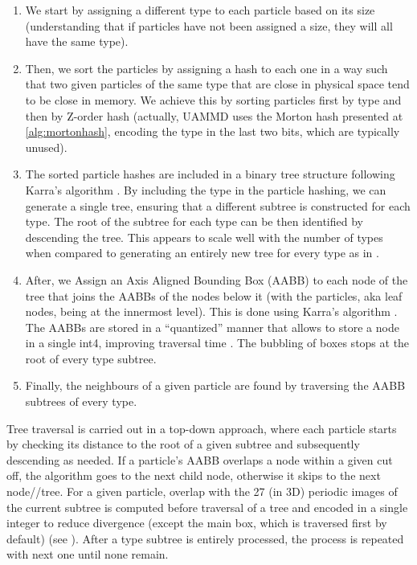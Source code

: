 \documentclass[ twoside,openright,titlepage,numbers=noenddot,%
headinclude,footinclude,cleardoublepage=empty,abstract=on,
BCOR=5mm,paper=b5,fontsize=11pt, dvipsnames
]{scrreprt}
\begin{document}
\begin{enumerate}
\item We start by assigning a different type to each particle based on its size (understanding that if particles have not been assigned a size, they will all have the same type).
\item Then, we sort the particles by assigning a hash to each one in a way such that two given particles of the same type that are close in physical space tend to be close in memory. We achieve this by sorting particles first by type and then by Z-order hash (actually, UAMMD uses the Morton hash presented at \ref{alg:mortonhash}, encoding the type in the last two bits, which are typically unused).
\item The sorted particle hashes are included in a binary tree structure following Karra's algorithm \cite{Karras2012}.
  By including the type in the particle hashing, we can generate a single tree, ensuring that a different subtree is constructed for each type. The root of the subtree for each type can be then identified by descending the tree. This appears to scale well with the number of types when compared to generating an entirely new tree for every type as in \cite{Howard2016,Howard2019}.
\item After, we Assign an Axis Aligned Bounding Box (AABB) to each node of the tree that joins the AABBs of the nodes below it (with the particles, aka leaf nodes, being at the innermost level). This is done using Karra's algorithm \cite{Karras2012}. The AABBs are stored in a ``quantized'' manner that allows to store a node in a single int4, improving traversal time \cite{Howard2019}. The bubbling of boxes stops at the root of every type subtree.
\item Finally, the neighbours of a given particle are found by traversing the AABB subtrees of every type\cite{Torres2009}.
\end{enumerate}
   
Tree traversal is carried out in a top-down approach, where each particle starts by checking its distance to the root of a given subtree and subsequently descending as needed. If a particle's AABB overlaps a node within a given cut off, the algorithm goes to the next child node, otherwise it skips to the next node//tree.
For a given particle, overlap with the 27 (in 3D) periodic images of the current subtree is computed before traversal of a tree and encoded in a single integer to reduce divergence (except the main box, which is traversed first by default) (see \cite{Howard2019}).
After a type subtree is entirely processed, the process is repeated with next one until none remain.
\end{document}
